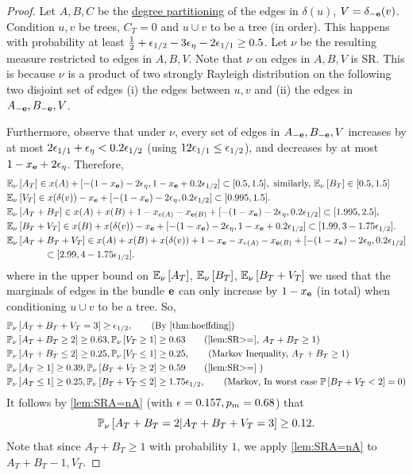 \xemoreepshalf*
\begin{proof}
Let $A,B,C$ be the \hyperlink{tar:degreepartition}{degree partitioning} of the edges in $\delta(u)$, $V=\delta_{-{\bf e}}(v)$.
Condition $u, v$ be trees, $C_T=0$ and $u \cup v$ to be a tree (in order). This happens with probability at least $\frac12+{\epsilon}_{1/2}-3{\epsilon}_\eta-2{\epsilon}_{1/1}\geq 0.5$. Let $\nu$ be the resulting measure restricted to edges in $A,B,V$. 
Note that $\nu$ on edges in $A,B,V$ is SR.
This is because $\nu$ is a product of two strongly Rayleigh distribution on the following two disjoint set of edges (i) the edges between $u,v$ and (ii) the edges in $A_{-{\bf e}},B_{-{\bf e}},V$.

Furthermore, observe that under $\nu$, every set of edges in $A_{-{\bf e}},B_{-{\bf e}},V$ increases by at most $2{\epsilon}_{1/1}+{\epsilon}_\eta<0.2{\epsilon}_{1/2}$ (using $12{\epsilon}_{1/1}\leq {\epsilon}_{1/2}$), and decreases by at most $1-x_{\bf e}+2{\epsilon}_{\eta}$.  Therefore,
\begin{align*}
&{\mathbb{E}}_{\nu}\left[A_T\right] \in x(A)+[-(1-x_{\bf e})-2{\epsilon}_{\eta},1-x_{\bf e}+0.2{\epsilon}_{1/2}]\subset   [0.5,1.5], \text{ similarly, }{\mathbb{E}}_{\nu}\left[B_T\right] \in [0.5,1.5]\\
& {\mathbb{E}}_{\nu}\left[V_T\right] \in x(\delta(v))-x_{\bf e}+ [-(1-x_{\bf e})-2{\epsilon}_{\eta},0.2{\epsilon}_{1/2}] \subset [ 0.995 , 1.5].\\
&{\mathbb{E}}_{\nu}\left[A_T+B_T\right] \in x(A)+x(B)+1-x_{e(A)}-x_{{\bf e}(B)}+ [-(1-x_{\bf e})-2{\epsilon}_{\eta},0.2{\epsilon}_{1/2}] \subset [1.995, 2.5],  \\
&{\mathbb{E}}_{\nu}\left[B_T+V_T\right]\in x(B)+x(\delta(v))-x_{\bf e}+ [-(1-x_{\bf e})-2{\epsilon}_{\eta}, 1-x_{\bf e}+0.2{\epsilon}_{1/2}]\subset [1.99, 3-1.75{\epsilon}_{1/2}].\\
&{\mathbb{E}}_{\nu}\left[A_T+B_T+V_T\right] \in x(A)+x(B)+x(\delta(v))+1-x_{\bf e}-x_{e(A)}-x_{{\bf e}(B)}+[-(1-x_{\bf e})-2{\epsilon}_{\eta},0.2{\epsilon}_{1/2}] \\
&\quad \quad \quad \quad \subset [2.99, 4-1.75{\epsilon}_{1/2}].
\end{align*}
where in the upper bound on ${\mathbb{E}}_{\nu}\left[A_T\right]$, ${\mathbb{E}}_{\nu}\left[B_T\right]$, ${\mathbb{E}}_{\nu}\left[B_T+V_T\right]$ we used that the marginals of edges in the bundle ${\bf e}$ can only increase by $1-x_{\bf e}$ (in total) when conditioning $u\cup v$ to be a tree.
So, 
\begin{align*} 
&\PP{\nu}{A_T+B_T+V_T=3} \geq \eps_{1/2}, \tag{By \cref{thm:hoeffding}}\\
&\PP{\nu}{A_T+B_T\geq 2}\geq 0.63, \PP{\nu}{V_T\geq 1} \geq 0.63\tag{\cref{lem:SR>=}, $A_T+B_T\geq 1$}\\
&\PP{\nu}{A_T+B_T\leq 2}\geq 0.25, \PP{\nu}{V_T\leq 1}\geq 0.25, \tag{Markov Inequality, $A_T+B_T\geq 1$}\\
& \PP{\nu}{A_T\geq 1} \geq 0.39, \PP{\nu}{B_T+V_T\geq 2}\geq 0.59 \tag{\cref{lem:SR>=} } \\
&\PP{\nu}{A_T\leq 1} \geq 0.25, \PP{\nu}{B_T+V_T\leq 2}\geq 1.75\eps_{1/2}, \tag{Markov, In worst case $\P{B_T+V_T<2}=0$}
\end{align*}
It follows by \cref{lem:SRA=nA} (with ${\epsilon}=0.157, p_m=0.68$) that
$$ {\mathbb{P}}_{\nu}\left[A_T+B_T=2 | A_T+B_T+V_T=3\right] \geq 0.12.$$
Note that since $A_T+B_T\geq 1$ with probability $1$, we apply \cref{lem:SRA=nA} to $A_T+B_T-1, V_T$. 


\end{proof}
